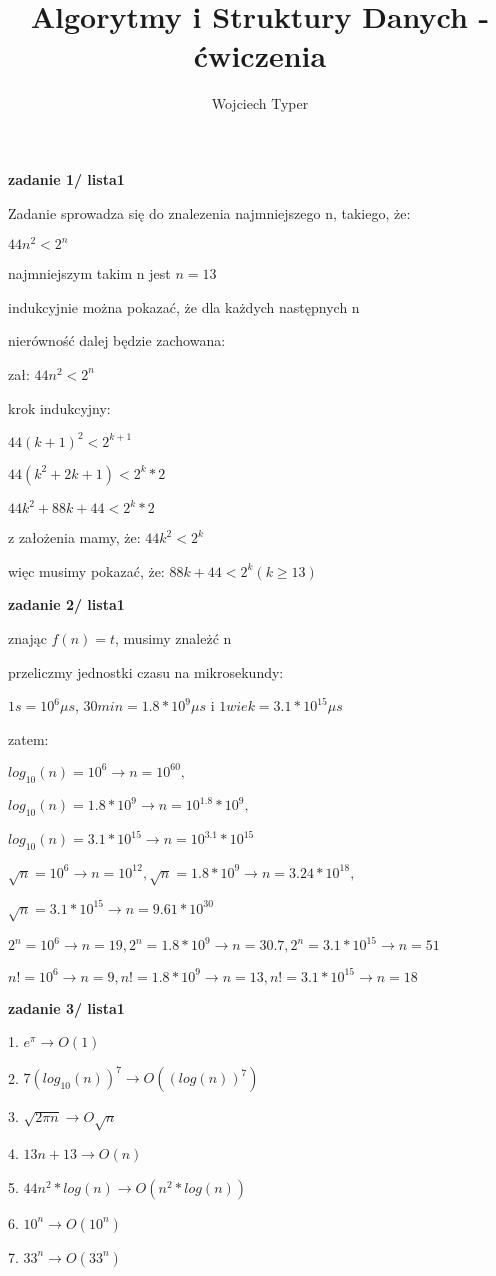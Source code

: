 \documentclass{article}
\title{Algorytmy i Struktury Danych - ćwiczenia}
\author{Wojciech Typer}
\date{}
\begin{document}
\maketitle
\textbf{zadanie 1/ lista1} \par
Zadanie sprowadza się do znalezenia najmniejszego n, 
takiego, że: \par
$44n^2 < 2^n$ \par
najmniejszym takim n jest $n = 13$ \par
indukcyjnie można pokazać, że dla każdych następnych n \par
nierówność dalej będzie zachowana: \par
zał: $44n^2 < 2^n$ \par
krok indukcyjny: \par
$44(k + 1)^2 < 2^{k + 1}$ \par
$44(k^2 + 2k + 1) < 2^k * 2$ \par
$44k^2 + 88k + 44 < 2^k * 2$ \par
z założenia mamy, że: $44k^2 < 2^k$ \par
więc musimy pokazać, że: $88k + 44 < 2^k (k \geq 13)$ \par

\vspace{1\baselineskip}
\textbf{zadanie 2/ lista1} \par
znając $f(n) = t$, musimy znależć n \par
przeliczmy jednostki czasu na mikrosekundy: \par
$1s = 10^6 \mu s$, $30min = 1.8 * 10^9 \mu s$ i $1 wiek = 3.1 * 10^15 \mu s$\par
zatem: \par
$log_{10}(n) = 10^6  \rightarrow n = 10^{60},$ \par $ log_{10}(n) = 1.8 * 10^9  \rightarrow n = 10^1.8 * 10^9,$ \par $ log_{10}(n) = 3.1 * 10^{15}  \rightarrow n = 10^3.1 * 10^{15}$ \par
$\sqrt{n} = 10^6  \rightarrow n = 10^{12}, \sqrt{n} = 1.8 * 10^9  \rightarrow n = 3.24 * 10^{18},$ \par $ \sqrt{n} = 3.1 * 10^{15}  \rightarrow n = 9.61 * 10^{30}$ \par
$2^n = 10^6  \rightarrow n = 19, 2^n = 1.8 * 10^9  \rightarrow n = 30.7, 2^n = 3.1 * 10^{15}  \rightarrow n = 51$ \par
$n! = 10^6  \rightarrow n = 9, n! = 1.8 * 10^9  \rightarrow n = 13, n! = 3.1 * 10^{15}  \rightarrow n = 18$ \par

\vspace{1\baselineskip}
\textbf{zadanie 3/ lista1} \par
1. $e^{\pi}   \rightarrow O(1)$ \par
2. $7(log_{10}(n))^7  \rightarrow O((log(n))^7)$ \par
3. $\sqrt{2\pi n}  \rightarrow O{\sqrt{n}}$ \par
4. $13n + 13  \rightarrow O(n)$ \par
5. $44n^2 * log(n)  \rightarrow O(n^2 * log(n))$ \par
6. $10^n  \rightarrow O(10^n)$ \par
7. $33^n  \rightarrow O(33^n)$ \par 
\end{document}
